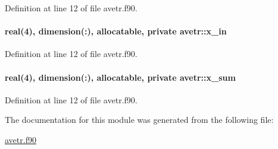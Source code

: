 Definition at line 12 of file avetr.\-f90.

\hypertarget{classavetr_a6dd92aa38db39955c93eb08eb615eb3f}{
\paragraph[{x\-\_\-in}]{\setlength{\rightskip}{0pt plus 5cm}real(4), dimension(\-:), allocatable, private avetr\-::x\-\_\-in\hspace{0.3cm}{\ttfamily [private]}}}\label{classavetr_a6dd92aa38db39955c93eb08eb615eb3f}


Definition at line 12 of file avetr.\-f90.

\hypertarget{classavetr_a5c8717414fbca53a109da52f0fb37dd8}{
\paragraph[{x\-\_\-sum}]{\setlength{\rightskip}{0pt plus 5cm}real(4), dimension(\-:), allocatable, private avetr\-::x\-\_\-sum\hspace{0.3cm}{\ttfamily [private]}}}\label{classavetr_a5c8717414fbca53a109da52f0fb37dd8}


Definition at line 12 of file avetr.\-f90.



The documentation for this module was generated from the following file\-:\begin{DoxyCompactItemize}
\item 
\hyperlink{avetr_8f90}{avetr.\-f90}\end{DoxyCompactItemize}
